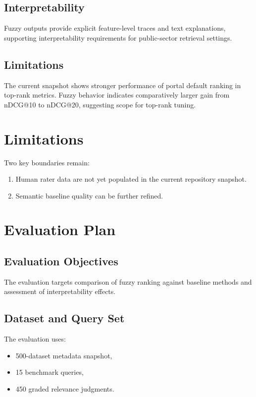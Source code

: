 \documentclass[11pt,a4paper]{article}
\begin{document}
\subsection{Interpretability}

Fuzzy outputs provide explicit feature-level traces and text explanations, supporting interpretability requirements for public-sector retrieval settings.

\subsection{Limitations}

The current snapshot shows stronger performance of portal default ranking in top-rank metrics. Fuzzy behavior indicates comparatively larger gain from nDCG@10 to nDCG@20, suggesting scope for top-rank tuning.

\section{Limitations}

Two key boundaries remain:
\begin{enumerate}
  \item Human rater data are not yet populated in the current repository snapshot.
  \item Semantic baseline quality can be further refined.
\end{enumerate}

\section{Evaluation Plan}

\subsection{Evaluation Objectives}

The evaluation targets comparison of fuzzy ranking against baseline methods and assessment of interpretability effects.

\subsection{Dataset and Query Set}

The evaluation uses:
\begin{itemize}
  \item 500-dataset metadata snapshot,
  \item 15 benchmark queries,
  \item 450 graded relevance judgments.
\end{itemize}
\end{document}
